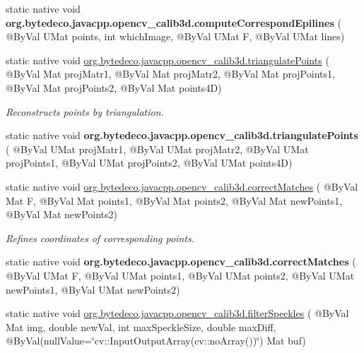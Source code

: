 \begin{DoxyCompactItemize}
\mbox{\label{group__calib3d_ga30be6c0a68f6de4e4afb9c51f750b587}} 
static native void {\bfseries org.\+bytedeco.\+javacpp.\+opencv\+\_\+calib3d.\+compute\+Correspond\+Epilines} ( @By\+Val U\+Mat points, int which\+Image, @By\+Val U\+Mat F, @By\+Val U\+Mat lines)
\item 
static native void \hyperlink{group__calib3d_ga12a47c5bb55266df7219c8f3e385f156}{org.\+bytedeco.\+javacpp.\+opencv\+\_\+calib3d.\+triangulate\+Points} ( @By\+Val Mat proj\+Matr1, @By\+Val Mat proj\+Matr2, @By\+Val Mat proj\+Points1, @By\+Val Mat proj\+Points2, @By\+Val Mat points4D)
\begin{DoxyCompactList}\small\item\em Reconstructs points by triangulation. \end{DoxyCompactList}\item 
\mbox{\label{group__calib3d_ga19e6ec08908075e982178c017ce6ed42}} 
static native void {\bfseries org.\+bytedeco.\+javacpp.\+opencv\+\_\+calib3d.\+triangulate\+Points} ( @By\+Val U\+Mat proj\+Matr1, @By\+Val U\+Mat proj\+Matr2, @By\+Val U\+Mat proj\+Points1, @By\+Val U\+Mat proj\+Points2, @By\+Val U\+Mat points4D)
\item 
static native void \hyperlink{group__calib3d_gad0d4f7daee2c8fda384311c1bce0965a}{org.\+bytedeco.\+javacpp.\+opencv\+\_\+calib3d.\+correct\+Matches} ( @By\+Val Mat F, @By\+Val Mat points1, @By\+Val Mat points2, @By\+Val Mat new\+Points1, @By\+Val Mat new\+Points2)
\begin{DoxyCompactList}\small\item\em Refines coordinates of corresponding points. \end{DoxyCompactList}\item 
\mbox{\label{group__calib3d_gac18b15689a8e6ca9d5681bd1d803d6b4}} 
static native void {\bfseries org.\+bytedeco.\+javacpp.\+opencv\+\_\+calib3d.\+correct\+Matches} ( @By\+Val U\+Mat F, @By\+Val U\+Mat points1, @By\+Val U\+Mat points2, @By\+Val U\+Mat new\+Points1, @By\+Val U\+Mat new\+Points2)
\item 
static native void \hyperlink{group__calib3d_ga18894b69acb224417c0f0a1afaded536}{org.\+bytedeco.\+javacpp.\+opencv\+\_\+calib3d.\+filter\+Speckles} ( @By\+Val Mat img, double new\+Val, int max\+Speckle\+Size, double max\+Diff, @By\+Val(null\+Value=\char`\"{}cv\+::\+Input\+Output\+Array(cv\+::no\+Array())\char`\"{}) Mat buf)

\end{DoxyCompactItemize}
